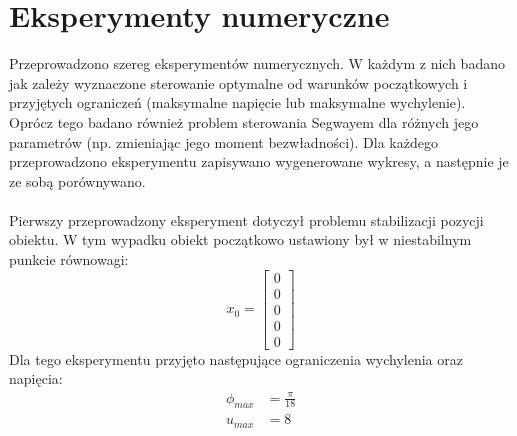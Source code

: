 \section{Eksperymenty numeryczne}
\label{eksperymenty_numeryczne}

Przeprowadzono szereg eksperymentów numerycznych. W każdym z nich badano jak zależy wyznaczone sterowanie optymalne od warunków początkowych i przyjętych ograniczeń (maksymalne napięcie lub maksymalne wychylenie). Oprócz tego badano również problem sterowania Segwayem dla różnych jego parametrów (np. zmieniając jego moment bezwładności). Dla każdego przeprowadzono eksperymentu zapisywano wygenerowane wykresy, a następnie je ze sobą porównywano.
\paragraph*{}
Pierwszy przeprowadzony eksperyment dotyczył problemu stabilizacji pozycji obiektu. W tym wypadku obiekt początkowo ustawiony był w niestabilnym punkcie równowagi:
\begin{equation}
x_0=\begin{bmatrix}
0\\
0\\
0\\
0\\
0
\end{bmatrix}
\end{equation}
Dla tego eksperymentu przyjęto następujące ograniczenia wychylenia oraz napięcia:
\begin{equation}
\begin{aligned}
\phi_{max}&=\frac{\pi}{18}\\
u_{max}&=8
\end{aligned}
\end{equation}



